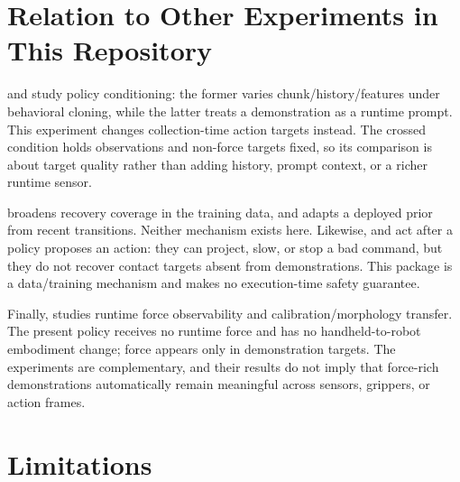 \documentclass[11pt]{article}
\begin{document}
\section{Relation to Other Experiments in This Repository}

 and  study policy conditioning: the former varies chunk/history/features under behavioral cloning, while the latter treats a demonstration as a runtime prompt. This experiment changes collection-time action targets instead. The crossed condition holds observations and non-force targets fixed, so its comparison is about target quality rather than adding history, prompt context, or a richer runtime sensor.

 broadens recovery coverage in the training data, and  adapts a deployed prior from recent transitions. Neither mechanism exists here. Likewise,  and  act after a policy proposes an action: they can project, slow, or stop a bad command, but they do not recover contact targets absent from demonstrations. This package is a data/training mechanism and makes no execution-time safety guarantee.

Finally,  studies runtime force observability and calibration/morphology transfer. The present policy receives no runtime force and has no handheld-to-robot embodiment change; force appears only in demonstration targets. The experiments are complementary, and their results do not imply that force-rich demonstrations automatically remain meaningful across sensors, grippers, or action frames.

\section{Limitations}
\end{document}
